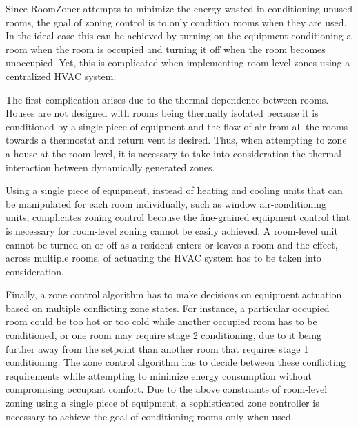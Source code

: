 
Since RoomZoner attempts to minimize the energy wasted in conditioning unused
rooms, the goal of zoning control is to only condition rooms when they are
used. In the ideal case this can be achieved by turning on the equipment
conditioning a room when the room is occupied and turning it off when the room
becomes unoccupied. Yet, this is complicated when implementing room-level zones
using a centralized HVAC system. 


The first complication arises due to the thermal dependence between
rooms. Houses are not designed with rooms being thermally isolated because it is
conditioned by a single piece of equipment and the flow of air from all the
rooms towards a thermostat and return vent is desired. Thus, when attempting to
zone a house at the room level, it is necessary to take into consideration the
thermal interaction between dynamically generated zones.
 

Using a single piece of equipment, instead of heating and cooling units that can
be manipulated for each room individually, such as window air-conditioning
units, complicates zoning control because the fine-grained equipment control
that is necessary for room-level zoning cannot be easily achieved. A room-level
unit cannot be turned on or off as a resident enters or leaves a room and the
effect, across multiple rooms, of actuating the HVAC system has to be taken into
consideration. 


Finally, a zone control algorithm has to make decisions on equipment actuation
based on multiple conflicting zone states. For instance, a particular occupied room could
be too hot or too cold while another occupied room has to be conditioned, or one
room may require stage 2 conditioning, due to it being further away from the
setpoint than another room that requires stage 1 conditioning. The zone control
algorithm has to decide between these conflicting requirements while attempting
to minimize energy consumption without compromising occupant comfort. Due to the
above constraints of room-level zoning using a single piece of equipment, a
sophisticated zone controller is necessary to achieve the goal of conditioning
rooms only when used. 

